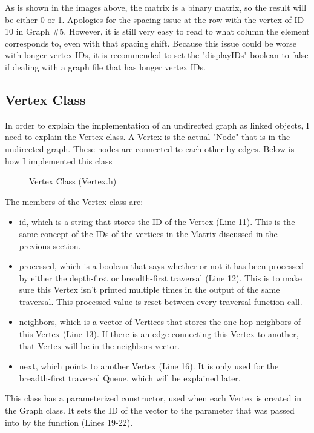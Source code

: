 \documentclass[letterpaper, 10pt]{article}
\begin{document}
\noindent
As is shown in the images above, the matrix is a binary matrix, so the result will be either 0 or 1. Apologies for the spacing issue at the row with the vertex of ID 10 in Graph \#5. However, it is still very easy to read to what column the element corresponds to, even with that spacing shift. Because this issue could be worse with longer vertex IDs, it is recommended to set the "displayIDs" boolean to false if dealing with a graph file that has longer vertex IDs.

\subsection{Vertex Class}
\noindent
In order to explain the implementation of an undirected graph as linked objects, I need to explain the Vertex class. A Vertex is the actual "Node" that is in the undirected graph. These nodes are connected to each other by edges. Below is how I implemented this class

\begin{figure}[H]
  \centering
   
  \caption{Vertex Class (Vertex.h)}
  \label{fig:figure2.10}
\end{figure}

\noindent
The members of the Vertex class are:
\begin{itemize}
    \item id, which is a string that stores the ID of the Vertex (Line 11). This is the same concept of the IDs of the vertices in the Matrix discussed in the previous section.
    \item processed, which is a boolean that says whether or not it has been processed by either the depth-first or breadth-first traversal (Line 12). This is to make sure this Vertex isn't printed multiple times in the output of the same traversal. This processed value is reset between every traversal function call.
    \item neighbors, which is a vector of Vertices that stores the one-hop neighbors of this Vertex (Line 13). If there is an edge connecting this Vertex to another, that Vertex will be in the neighbors vector.
    \item next, which points to another Vertex (Line 16). It is only used for the breadth-first traversal Queue, which will be explained later.
\end{itemize}

\noindent
This class has a parameterized constructor, used when each Vertex is created in the Graph class. It sets the ID of the vector to the parameter that was passed into by the function (Lines 19-22).
\end{document}
